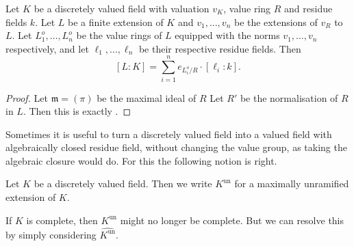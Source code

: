 \begin{proposition}\label{prop:balancing_valuations}
	Let $K$ be a discretely valued field with valuation $v_K$,  value ring $R$ and residue fields $k$. 
	Let $L$ be a finite extension of $K$ and $v_1, \ldots, v_n$ be the extensions of $v_R$ to $L$. 
	Let $L_1^{o}, \ldots, L_n^{o}$ be the value rings of $L$ equipped with the norms $v_1, \ldots, v_n$ respectively, and let $\ell_1, \ldots, \ell_n$ be their respective residue fields. 
	Then \[
		[L: K] = \sum_{i= 1}^{n} e_{L_i^{o} / R} \cdot [\ell_i: k]
	.\] 
\end{proposition}
\begin{proof}
	Let $\mathfrak{m} = (\pi) $ be the maximal ideal of $R$
	Let $R'$ be the normalisation of $R$ in $L$. 
	Then this is exactly .
\end{proof}

Sometimes it is useful to turn a discretely valued field into a valued field with algebraically closed residue field, without changing the value group, as taking the algebraic closure would do. 
For this the following notion is right. 
\begin{definition}
	Let $K$ be a discretely valued field. 
	Then we write $K^{\text{un}}$ for a maximally unramified extension of $K$. 
\end{definition}
If $K$ is complete, then $K^{\text{un}}$ might no longer be complete. But we can resolve this by simply considering $\hat{K^{\text{un}}}$. 
 
